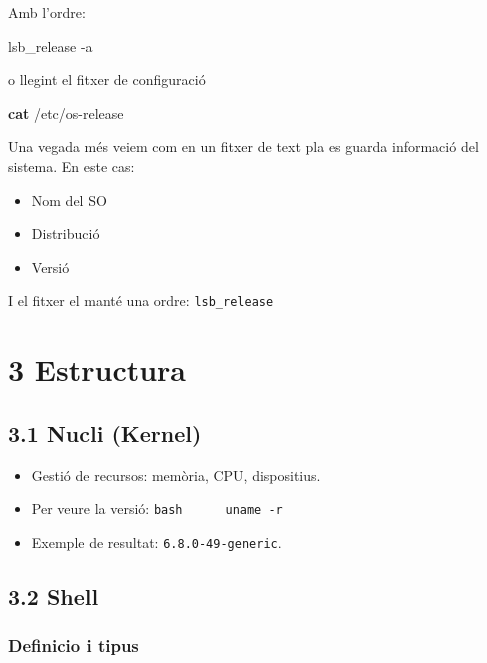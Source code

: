 \documentclass[
  a4paper,
]{article}
\newenvironment{Shaded}{\begin{snugshade}}{\end{snugshade}}
\newcommand{\AttributeTok}[1]{\textcolor[rgb]{0.13,0.29,0.53}{#1}}
\newcommand{\ExtensionTok}[1]{#1}
\newcommand{\FunctionTok}[1]{\textcolor[rgb]{0.13,0.29,0.53}{\textbf{#1}}}
\newcommand{\NormalTok}[1]{#1}
\providecommand{\tightlist}{%
  \setlength{\itemsep}{0pt}\setlength{\parskip}{0pt}}
\begin{document}
Amb l'ordre:

\begin{Shaded}
\begin{Highlighting}[]
\ExtensionTok{lsb\_release} \AttributeTok{{-}a}
\end{Highlighting}
\end{Shaded}

o llegint el fitxer de configuració

\begin{Shaded}
\begin{Highlighting}[]
\FunctionTok{cat}\NormalTok{ /etc/os{-}release}
\end{Highlighting}
\end{Shaded}

Una vegada més veiem com en un fitxer de text pla es guarda informació
del sistema. En este cas:

\begin{itemize}
\tightlist
\item
  Nom del SO
\item
  Distribució
\item
  Versió
\end{itemize}

I el fitxer el manté una ordre: \texttt{lsb\_release}

\section{3 Estructura}\label{estructura}

\subsection{3.1 Nucli (Kernel)}\label{nucli-kernel}

\begin{itemize}
\tightlist
\item
  Gestió de recursos: memòria, CPU, dispositius.
\item
  Per veure la versió: \texttt{bash\ \ \ \ \ \ uname\ -r}
\item
  Exemple de resultat: \texttt{6.8.0-49-generic}.
\end{itemize}

\subsection{3.2 Shell}\label{shell}

\subsubsection{Definicio i tipus}\label{definicio-i-tipus}
\end{document}
